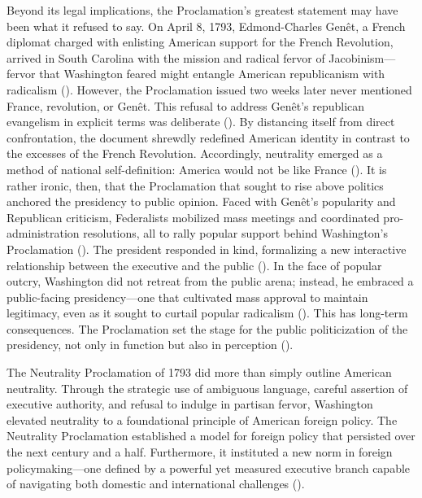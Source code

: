 Beyond its legal implications, the Proclamation’s greatest statement may have been what it refused to say. On April 8, 1793, Edmond-Charles Genêt, a French diplomat charged with enlisting American support for the French Revolution, arrived in South Carolina with the mission and radical fervor of Jacobinism—fervor that Washington feared might entangle American republicanism with radicalism (\cites[p.\ 464]{sheridan1994}[pp.\ 444–445]{mccullough2008}{hamilton1793}). However, the Proclamation issued two weeks later never mentioned France, revolution, or Genêt. This refusal to address Genêt’s republican evangelism in explicit terms was deliberate (\cite{washington1793}). By distancing itself from direct confrontation, the document shrewdly redefined American identity in contrast to the excesses of the French Revolution. Accordingly, neutrality emerged as a method of national self-definition: America would not be like France (\cites[p.\ 470]{sheridan1994}[p.\ 465]{young2011}). It is rather ironic, then, that the Proclamation that sought to rise above politics anchored the presidency to public opinion. Faced with Genêt’s popularity and Republican criticism, Federalists mobilized mass meetings and coordinated pro-administration resolutions, all to rally popular support behind Washington’s Proclamation (\cite[p.\ 454–456]{young2011}). The president responded in kind, formalizing a new interactive relationship between the executive and the public (\cite[pp.\ 437, 456–58, 462]{young2011}). In the face of popular outcry, Washington did not retreat from the public arena; instead, he embraced a public-facing presidency—one that cultivated mass approval to maintain legitimacy, even as it sought to curtail popular radicalism (\cite[p.\ 465]{sheridan1994}). This has long-term consequences. The Proclamation set the stage for the public politicization of the presidency, not only in function but also in perception (\cite[p.\ 435]{young2011}).

The Neutrality Proclamation of 1793 did more than simply outline American neutrality. Through the strategic use of ambiguous language, careful assertion of executive authority, and refusal to indulge in partisan fervor, Washington elevated neutrality to a foundational principle of American foreign policy. The Neutrality Proclamation established a model for foreign policy that persisted over the next century and a half. Furthermore, it instituted a new norm in foreign policymaking—one defined by a powerful yet measured executive branch capable of navigating both domestic and international challenges (\cite[p.\ 107]{reinstein2011}).


